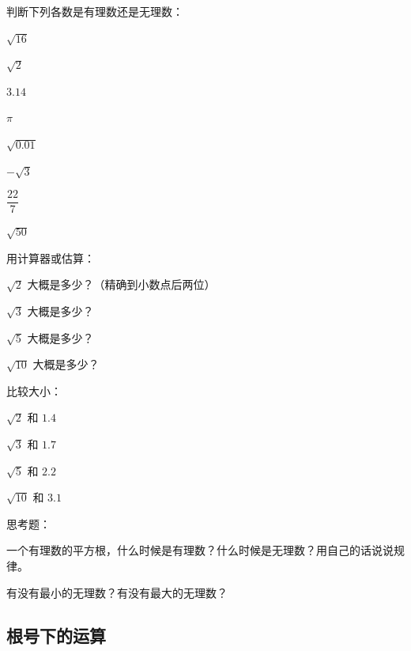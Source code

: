 \begin{exercise}
\item 判断下列各数是有理数还是无理数：
  \begin{subexercise}
    \item $\sqrt{16}$
    \item $\sqrt{2}$
    \item $3.14$
    \item $\pi$
    \item $\sqrt{0.01}$
    \item $-\sqrt{3}$
    \item $\dfrac{22}{7}$
    \item $\sqrt{50}$
  \end{subexercise}

\item 用计算器或估算：
  \begin{subexercise}
    \item $\sqrt{2}$ 大概是多少？（精确到小数点后两位）
    \item $\sqrt{3}$ 大概是多少？
    \item $\sqrt{5}$ 大概是多少？
    \item $\sqrt{10}$ 大概是多少？
  \end{subexercise}

\item 比较大小：
  \begin{subexercise}
    \item $\sqrt{2}$ 和 $1.4$
    \item $\sqrt{3}$ 和 $1.7$
    \item $\sqrt{5}$ 和 $2.2$
    \item $\sqrt{10}$ 和 $3.1$
  \end{subexercise}

\item 思考题：
  \begin{subexercise}
    \item 一个有理数的平方根，什么时候是有理数？什么时候是无理数？用自己的话说说规律。
    \item 有没有最小的无理数？有没有最大的无理数？
  \end{subexercise}
\end{exercise}


\subsection*{根号下的运算}

